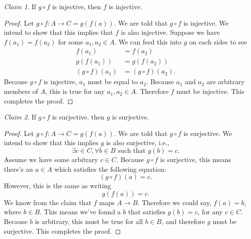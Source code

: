 \documentclass[12pt,oneside]{amsart}
\theoremstyle{remark}
\newtheorem{claim}{Claim}[exer]
\begin{document}
\begin{claim}
If $g \circ f$ is injective, then $f$ is injective.
\end{claim}
\begin{proof}
Let $g \circ f : A \to C = g(f(a))$. We are told that $g \circ f$ is injective. We intend to show that this implies that $f$ is also injective. Suppose we have $f(a_1) = f(a_2)$ for some $a_1, a_2 \in A$. We can feed this into $g$ on each sides to see
\begin{equation}
\begin{split}
          f(a_1) &= f(a_2) \\
       g(f(a_1)) &= g(f(a_2)) \\
(g \circ f)(a_1) &= (g \circ f)(a_2).
\end{split}
\end{equation}
Because $g \circ f$ is injective, $a_1$ must be equal to $a_2$. Because $a_1$ and $a_2$ are arbitrary members of $A$, this is true for any $a_1, a_2 \in A$. Therefore $f$ must be injective. This completes the proof.
\end{proof}

\begin{claim}
If $g \circ f$ is surjective, then $g$ is surjective.
\end{claim}
\begin{proof}
Let $g \circ f : A \to C = g(f(a))$. We are told that $g \circ f$ is surjective. We intend to show that this implies $g$ is also surjective, i.e., \[ \exists c \in C, \forall b \in B \text{ such that } g(b) = c. \] Assume we have some arbitrary $c \in C$. Because $g \circ f$ is surjective, this means there's an $a \in A$ which satisfies the following equation: \[ (g \circ f)(a) = c. \] However, this is the same as writing \[ g(f(a)) = c. \] We know from the claim that $f$ maps $A
\to B$. Therefore we could say, $f(a) = b$, where $b \in B$. This means we've found a $b$ that satisfies $g(b) = c$, for any $c \in C$. Because $b$ is arbitrary, this must be true for all $b \in B$, and therefore $g$ must be surjective. This completes the proof.
\end{proof}
\end{document}
